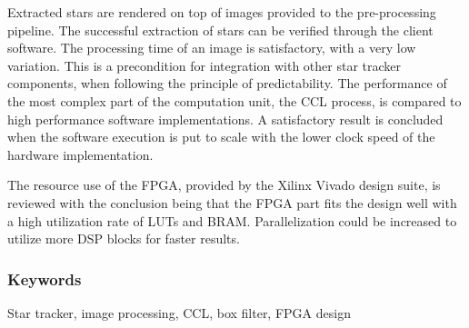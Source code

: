 \documentclass[12pt]{report}
\begin{document}
Extracted stars are rendered on top of images provided to the pre-processing pipeline. The successful extraction of stars can be verified through the client software. The processing time of an image is satisfactory, with a very low variation.
This is a precondition for integration with other star tracker components, when following the principle of predictability. The performance of the most complex part of the computation unit, the CCL process, is compared to high performance
software implementations. A satisfactory result is concluded when the software execution is put to scale with the lower clock speed of the hardware implementation.

The resource use of the FPGA, provided by the Xilinx Vivado design suite, is reviewed with the conclusion being that the FPGA part fits the design well with a high utilization rate of LUTs and BRAM. Parallelization could be increased to utilize more DSP blocks for faster results.

\subsubsection*{Keywords}
Star tracker, image processing, CCL, box filter, FPGA design
\end{document}
